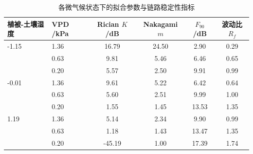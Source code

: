 \begin{table}[htbp]
\centering
\caption{各微气候状态下的拟合参数与链路稳定性指标}
\label{tab:fading_param}
\begin{tabular}{llcccc}
\toprule
植被-土壤湿度 & VPD /kPa & Rician $K$ /dB & Nakagami $m$ & $F_{90}$ /dB & 波动比 $R_f$ \\
\midrule
-1.15 & 1.36 & 16.79 & 24.50 & 2.90 & 0.29 \\
 & 0.63 & 9.81 & 5.46 & 6.46 & 0.65 \\
 & 0.20 & 5.57 & 2.50 & 9.91 & 0.99 \\
\midrule
-0.01 & 1.36 & 9.61 & 5.22 & 6.42 & 0.64 \\
 & 0.63 & 5.60 & 2.51 & 9.99 & 1.00 \\
 & 0.20 & 1.55 & 1.45 & 13.53 & 1.35 \\
\midrule
1.19 & 1.36 & 5.14 & 2.34 & 9.90 & 0.99 \\
 & 0.63 & 1.18 & 1.43 & 13.47 & 1.35 \\
 & 0.20 & -45.19 & 1.00 & 17.39 & 1.74 \\
\bottomrule
\end{tabular}
\end{table}